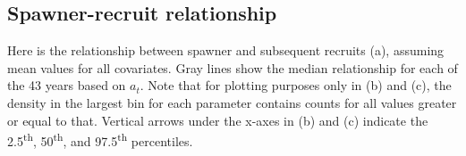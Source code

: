 \documentclass[
  11pt,
]{article}
\begin{document}
\hypertarget{spawner-recruit-relationship}{%
\subsection{Spawner-recruit
relationship}\label{spawner-recruit-relationship}}

Here is the relationship between spawner and subsequent recruits (a),
assuming mean values for all covariates. Gray lines show the median
relationship for each of the 43 years based on \(a_t\). Note that for
plotting purposes only in (b) and (c), the density in the largest bin
for each parameter contains counts for all values greater or equal to
that. Vertical arrows under the x-axes in (b) and (c) indicate the
2.5\textsuperscript{th}, 50\textsuperscript{th}, and
97.5\textsuperscript{th} percentiles.
\end{document}
